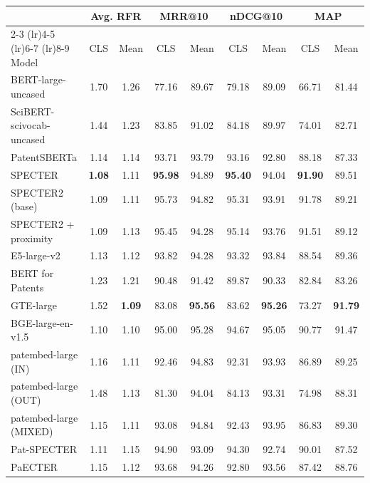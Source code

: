 \begin{tabular}{l cc cc cc cc}
    \toprule
    & \multicolumn{2}{c}{Avg. RFR} & \multicolumn{2}{c}{MRR@10} & \multicolumn{2}{c}{nDCG@10} & \multicolumn{2}{c}{MAP} \\
    \cmidrule(lr){2-3} \cmidrule(lr){4-5} \cmidrule(lr){6-7} \cmidrule(lr){8-9}
Model & CLS & Mean & CLS & Mean & CLS & Mean & CLS & Mean \\
    \midrule
    BERT-large-uncased & 1.70 & 1.26 & 77.16 & 89.67 & 79.18 & 89.09 & 66.71 & 81.44 \\
    SciBERT-scivocab-uncased & 1.44 & 1.23 & 83.85 & 91.02 & 84.18 & 89.97 & 74.01 & 82.71 \\
    PatentSBERTa & 1.14 & 1.14 & 93.71 & 93.79 & 93.16 & 92.80 & 88.18 & 87.33 \\
    SPECTER & \textbf{1.08} & 1.11 & \textbf{95.98} & 94.89 & \textbf{95.40} & 94.04 & \textbf{91.90} & 89.51 \\
    SPECTER2 (base) & 1.09 & 1.11 & 95.73 & 94.82 & 95.31 & 93.91 & 91.78 & 89.21 \\
    SPECTER2 + proximity & 1.09 & 1.13 & 95.45 & 94.28 & 95.14 & 93.76 & 91.51 & 89.12 \\
    E5-large-v2 & 1.13 & 1.12 & 93.82 & 94.28 & 93.32 & 93.84 & 88.54 & 89.36 \\
    BERT for Patents & 1.23 & 1.21 & 90.48 & 91.42 & 89.87 & 90.33 & 82.84 & 83.26 \\
    GTE-large & 1.52 & \textbf{1.09} & 83.08 & \textbf{95.56} & 83.62 & \textbf{95.26} & 73.27 & \textbf{91.79} \\
    BGE-large-en-v1.5 & 1.10 & 1.10 & 95.00 & 95.28 & 94.67 & 95.05 & 90.77 & 91.47 \\
    patembed-large (IN) & 1.16 & 1.11 & 92.46 & 94.83 & 92.31 & 93.93 & 86.89 & 89.25 \\
    patembed-large (OUT) & 1.48 & 1.13 & 81.30 & 94.04 & 84.13 & 93.31 & 74.98 & 88.31 \\
    patembed-large (MIXED) & 1.15 & 1.11 & 93.08 & 94.84 & 92.43 & 93.95 & 86.83 & 89.30 \\
    Pat-SPECTER & 1.11 & 1.15 & 94.90 & 93.09 & 94.30 & 92.74 & 90.01 & 87.52 \\
    PaECTER & 1.15 & 1.12 & 93.68 & 94.26 & 92.80 & 93.56 & 87.42 & 88.76 \\
    \bottomrule
\end{tabular}
